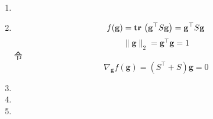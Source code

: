 \documentclass[11pt,letter,notitlepage]{article}
\DeclareMathOperator*{\tr}{\bf tr\,}
\begin{document}
\begin{solution}
    \begin{enumerate}
        \item
        \item $$f(\mathbf{g})
                  =\tr \left( \mathbf{g}^\top S \mathbf{g}\right)
                  =\mathbf{g}^\top S \mathbf{g}$$
              $$\|\mathbf{g}\|_2=\mathbf{g}^\top \mathbf{g}=1$$
              令
              $$\nabla_\mathbf{g} f(\mathbf{g})=\left( S^\top +S \right) \mathbf{g}= 0$$
        \item
        \item
        \item
    \end{enumerate}
\end{solution}





\end{document}
